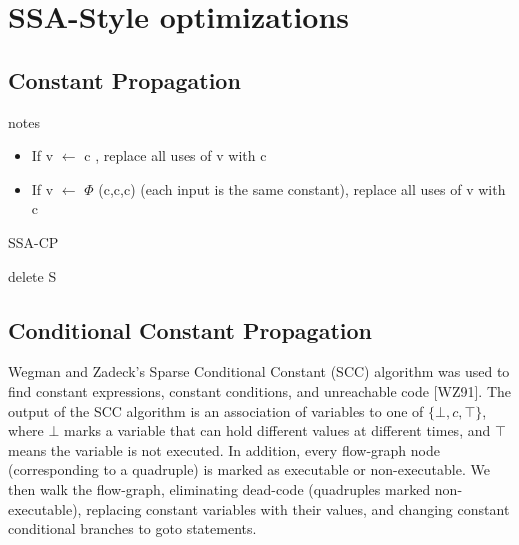 \newpage

\section{SSA-Style optimizations}

\subsection{Constant Propagation}
\begin{note}{notes}
\begin{itemize}
    \item If  v $\gets$ c , replace all uses of v with c 
    \item If  v $\gets$  $\Phi$ (c,c,c)  (each input is the same constant), replace all uses of v with c
\end{itemize}
\end{note}


\begin{algorithm}
\caption{SSA-CP}\label{alg:SSA-CP}
\begin{algorithmic}

\State delete S
\EndFor
\EndIf
\EndWhile

\end{algorithmic}
\end{algorithm}

\subsection{Conditional Constant Propagation }

Wegman and Zadeck's Sparse Conditional Constant (SCC) algorithm was used to find constant expressions, constant conditions, and unreachable code [WZ91]. The output of the SCC algorithm is an association of variables to one of $\lbrace \bot, c, \top \rbrace$, where $\bot$ marks a variable that can hold different values at different times, and $\top$ means the variable is not executed. In addition, every flow-graph node (corresponding to a quadruple) is marked as executable or non-executable. We then walk the flow-graph, eliminating dead-code (quadruples marked non-executable), replacing constant variables with their values, and changing constant conditional branches to goto statements.

